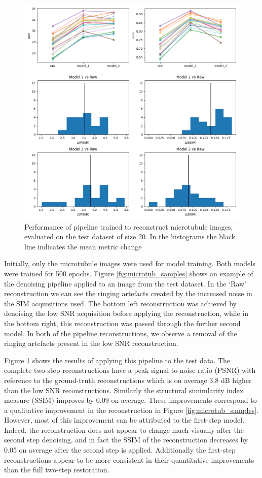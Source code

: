 \documentclass[12pt]{article}
\begin{document}
\begin{figure}[hbtp]
    \includegraphics[scale=0.7, center]{figures/m019_m020_pipeline_stats.png}
    \caption{Performance of pipeline trained to reconstruct microtubule images, evaluated on the test dataset of size 20.
    In the histograms the black line indicates the mean metric change}
    \label{fig:m019_m020_pipeline_stats}
\end{figure}

Initially, only the microtubule images were used for model training.
Both models were trained for 500 epochs.
Figure \ref{fig:microtub_samples} shows an example of the denoising pipeline applied to an image from the test dataset.
In the `Raw' reconstruction we can see the ringing artefacts created by the increased noise in the SIM acquisitions used.
The bottom left reconstruction was achieved by denoising the low SNR acquisition before applying the reconstruction,
while in the bottom right, this reconstruction was passed through the further second model.
In both of the pipeline reconstructions, we observe a removal of the ringing artefacts present in the low SNR reconstruction.

Figure \ref{fig:m019_m020_pipeline_stats} shows the results of applying this pipeline to the test data.
The complete two-step reconstructions have a peak signal-to-noise ratio (PSNR) with reference to the ground-truth reconstructions which is on average 3.8 dB higher than the low SNR reconstructions.
Similarly the structural simimlarity index measure (SSIM) improves by 0.09 on average.
These improvements correspond to a qualitative improvement in the reconstruction in Figure \ref{fig:microtub_samples}.
However, most of this improvement can be attributed to the first-step model.
Indeed, the reconstruction does not appear to change much visually after the second step denoising,
and in fact the SSIM of the reconstruction decreases by 0.05 on average after the second step is applied.
Additionally the first-step reconstructions appear to be more consistent in their quantitative improvements than the full two-step restoration.
\end{document}

